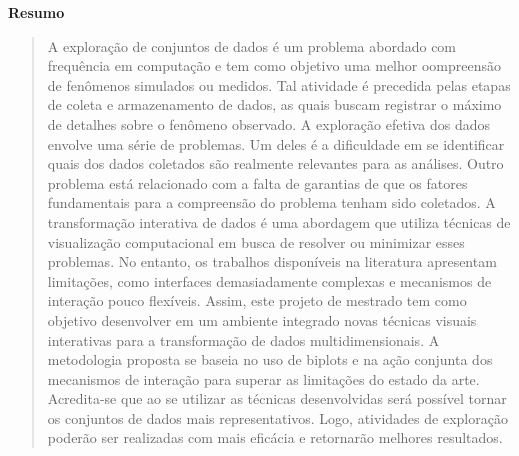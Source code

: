 \begin{center}
  \textbf{Resumo}
\end{center}

\begin{quotation}
\noindent
%
A exploração de conjuntos de dados é um problema abordado
com frequência em computação e tem como objetivo uma melhor
oompreensão de fenômenos simulados ou medidos.
%
Tal atividade é precedida pelas etapas de coleta e
armazenamento de dados, as quais buscam registrar o máximo
de detalhes sobre o fenômeno observado.
%
A exploração efetiva dos dados envolve uma série de
problemas. Um deles é a dificuldade em se identificar quais
dos dados coletados são realmente relevantes para as
análises. Outro problema está relacionado com a falta de
garantias de que os fatores fundamentais para a compreensão
do problema tenham sido coletados.
% 
A transformação interativa de dados é uma abordagem que
utiliza técnicas de visualização computacional em busca de
resolver ou minimizar esses problemas. No entanto, os
trabalhos disponíveis na literatura apresentam limitações,
como interfaces demasiadamente complexas e mecanismos de
interação pouco flexíveis. 
%
Assim, este projeto de mestrado tem como objetivo
desenvolver em um ambiente integrado novas técnicas visuais
interativas para a transformação de dados multidimensionais.
A metodologia proposta se baseia no uso de biplots e na
ação conjunta dos mecanismos de interação para superar as
limitações do estado da arte.
%
Acredita-se que ao se utilizar as técnicas desenvolvidas
será possível tornar os conjuntos de dados mais
representativos. Logo, atividades de exploração poderão ser
realizadas com mais eficácia e retornarão melhores
resultados.

\end{quotation}

\clearpage
